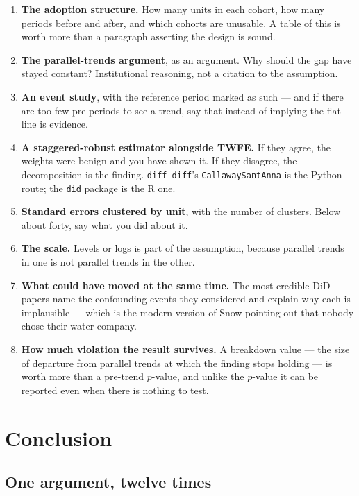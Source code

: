 \documentclass[
  letterpaper,
  10pt,
  twoside,
  openright,
  numbers=noenddot,
  chapterprefix=true]{scrbook}
\providecommand{\tightlist}{%
  \setlength{\itemsep}{0pt}\setlength{\parskip}{0pt}}
\begin{document}
\begin{enumerate}
\def\labelenumi{\arabic{enumi}.}
\tightlist
\item
  \textbf{The adoption structure.} How many units in each cohort, how
  many periods before and after, and which cohorts are unusable. A table
  of this is worth more than a paragraph asserting the design is sound.
\item
  \textbf{The parallel-trends argument}, as an argument. Why should the
  gap have stayed constant? Institutional reasoning, not a citation to
  the assumption.
\item
  \textbf{An event study}, with the reference period marked as such ---
  and if there are too few pre-periods to see a trend, say that instead
  of implying the flat line is evidence.
\item
  \textbf{A staggered-robust estimator alongside TWFE.} If they agree,
  the weights were benign and you have shown it. If they disagree, the
  decomposition is the finding. \texttt{diff-diff}'s
  \texttt{CallawaySantAnna} is the Python route; the \texttt{did}
  package is the R one.
\item
  \textbf{Standard errors clustered by unit}, with the number of
  clusters. Below about forty, say what you did about it.
\item
  \textbf{The scale.} Levels or logs is part of the assumption, because
  parallel trends in one is not parallel trends in the other.
\item
  \textbf{What could have moved at the same time.} The most credible DiD
  papers name the confounding events they considered and explain why
  each is implausible --- which is the modern version of Snow pointing
  out that nobody chose their water company.
\item
  \textbf{How much violation the result survives.} A breakdown value ---
  the size of departure from parallel trends at which the finding stops
  holding --- is worth more than a pre-trend \(p\)-value, and unlike the
  \(p\)-value it can be reported even when there is nothing to test.
\end{enumerate}


\chapter{Conclusion}\label{conclusion}

\section{One argument, twelve times}\label{one-argument-twelve-times}
\end{document}
